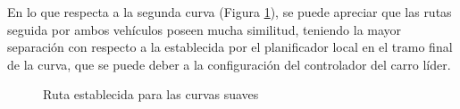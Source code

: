 \par En lo que respecta a la segunda curva (Figura \ref{fig:rcs}), se puede apreciar que las rutas seguida por ambos vehículos poseen mucha similitud, teniendo la mayor separación con respecto a la establecida por el planificador local en el tramo final de la curva, que se puede deber a la configuración del controlador del carro líder. \\  

\begin{figure}[H]
 \centering
 \caption{Ruta establecida para las curvas suaves}
 \label{fig:rcs}
\end{figure}


